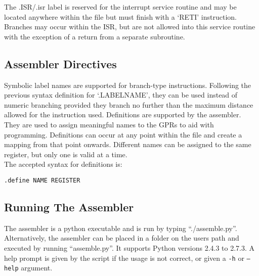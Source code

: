  The .ISR/.isr label is reserved for the interrupt service routine and may be located anywhere within the file but must finish with a `RETI' instruction. 
Branches may occur within the ISR, but are not allowed into this service routine with the exception of a return from a separate subroutine. 

\subsection{Assembler Directives}
Symbolic label names are supported for branch-type instructions. Following the previous syntax definition for `.LABELNAME', they can be used instead of numeric branching provided they branch no further than the maximum distance allowed for the instruction used. 
Definitions are supported by the assembler. 
They are used to assign meaningful names to the GPRs to aid with programming.
Definitions can occur at any point within the file and create a mapping from that point onwards. 
Different names can be assigned to the same register, but only one is valid at a time. \\


 The accepted syntax for definitions is:

\begin{center}\texttt{.define NAME REGISTER}\end{center}

\subsection{Running The Assembler}\label{sect:runningassembler}

The assembler is a python executable and is run by typing ``./assemble.py''. 
Alternatively, the assembler can be placed in a folder on the users path and executed by running ``assemble.py''.
It supports Python versions 2.4.3 to 2.7.3.
A help prompt is given by the script if the usage is not correct, or given a \texttt{-h} or \texttt{--help} argument. 

